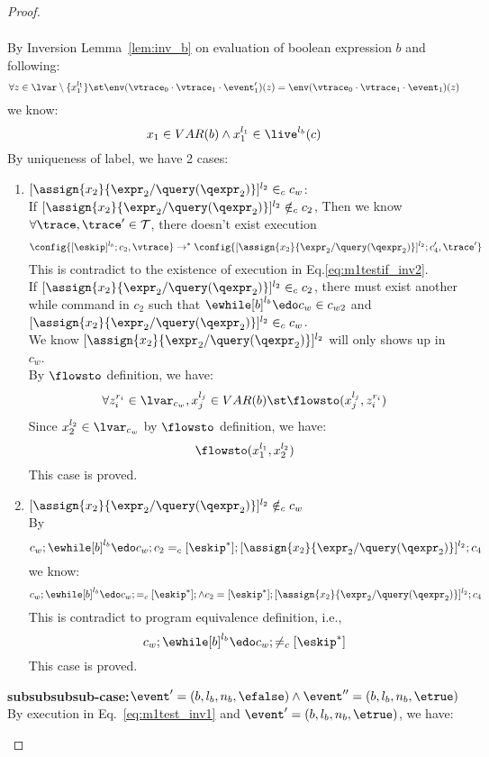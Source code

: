 {\begin{proof}
\begin{case}[$\trace_2 = \trace_{ih} \cdot \event_{ih}$]
\begin{subproof}
\[\begin{array}{l}
\end{array}
 \]
By Inversion Lemma~\ref{lem:inv_b} on evaluation of boolean expression $b$ and following: 
\[
  \forall z \in \lvar \setminus \{x_1^{l_1}\} \st
  \env(\vtrace_0 \cdot \vtrace_1 \cdot \event_1')(z) = \env(\vtrace_0 \cdot \vtrace_1 \cdot \event_1)(z)
\]
we know:
\[
  x_1 \in VAR(b) \land x_1^{l_1} \in \live^{l_b}(c)
\]
%
 By uniqueness of label, we have 2 cases:
 \begin{enumerate}
 \item $[\assign{{x}_2}{\expr_2 / \query(\qexpr_2)}]^{l_2} \in_c c_w$:
 \\
 If $[\assign{{x}_2}{\expr_2 / \query(\qexpr_2)}]^{l_2} \notin_c c_2$,
 Then we know $\forall \trace, \trace' \in \mathcal{T}$, there doesn't exist execution
 \[
  \config{[\eskip]^{l_b};c_2, \vtrace} \rightarrow^{*} 
  \config{[\assign{{x}_2}{\expr_2 / \query(\qexpr_2)}]^{l_2};{c}_4', \trace'}
 \]
 This is contradict to the existence of execution in Eq.\ref{eq:m1testif_inv2}.
 \\
  If $[\assign{{x}_2}{\expr_2 / \query(\qexpr_2)}]^{l_2} \in_c c_2$, there must exist another while command
   in $c_2$ such that 
  $\ewhile [b]^{l_b} \edo c_w \in c_{w2}$ and $[\assign{{x}_2}{\expr_2 / \query(\qexpr_2)}]^{l_2} \in_c c_w$.
  \\
  We know $[\assign{{x}_2}{\expr_2 / \query(\qexpr_2)}]^{l_2}$ will only shows up in $c_w$.
  \\
  By $\flowsto$ definition, we have:
  \[
    \forall z_i^{r_i} \in \lvar_{c_w}, x_j^{l_j} \in VAR(b) \st
    \flowsto(x_j^{l_j}, z_i^{r_i})
  \]
  Since $x_2^{l_2} \in \lvar_{c_w}$ by $\flowsto$ definition, we have: 
  \[
    \flowsto(x_1^{l_1}, x_2^{l_2})
  \]
  This case is proved.
 \item $[\assign{{x}_2}{\expr_2 / \query(\qexpr_2)}]^{l_2} \notin_c c_w$
 \\
 By
 \[
  c_w;\ewhile [b]^{l_b} \edo c_w; c_2 =_c [\eskip^*]; [\assign{{x}_2}{\expr_2 / \query(\qexpr_2)}]^{l_2};{c}_4
\]
we know:
\[
  c_w;\ewhile [b]^{l_b} \edo c_w; =_c [\eskip^*]; \land c_2 = [\eskip^*]; [\assign{{x}_2}{\expr_2 / \query(\qexpr_2)}]^{l_2};{c}_4
\]
This is contradict to program equivalence definition, i.e.,
\[
  c_w;\ewhile [b]^{l_b} \edo c_w; \neq_c [\eskip^*]
\]
This case is proved.
%
 \end{enumerate}
%
\textbf{subsubsubsub-case:}$\event' = (b, l_b, n_b, \efalse) \land \event'' = (b, l_b, n_b, \etrue)$
\\
By execution in Eq.~\ref{eq:m1test_inv1} and $\event' = (b, l_b, n_b, \etrue)$, we have:

\end{subproof}
\end{case}
\end{proof}}
